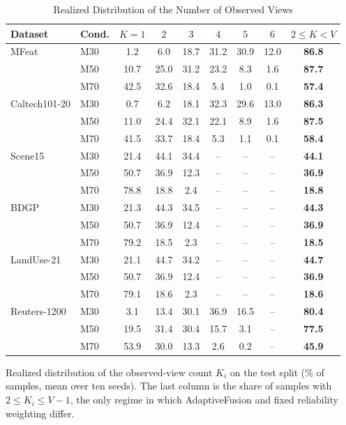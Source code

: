 \begin{table}[!t]
\caption{Realized Distribution of the Number of Observed Views}
\label{tab:kdist}
\centering
\footnotesize
\setlength{\tabcolsep}{3pt}
\begin{tabular}{llccccccc}
\toprule
Dataset & Cond. & $K{=}1$ & $2$ & $3$ & $4$ & $5$ & $6$ & $2{\le}K{<}V$ \\
\midrule
MFeat & M30 & 1.2 & 6.0 & 18.7 & 31.2 & 30.9 & 12.0 & \textbf{86.8} \\
 & M50 & 10.7 & 25.0 & 31.2 & 23.2 & 8.3 & 1.6 & \textbf{87.7} \\
 & M70 & 42.5 & 32.6 & 18.4 & 5.4 & 1.0 & 0.1 & \textbf{57.4} \\
\addlinespace[2pt]
Caltech101-20 & M30 & 0.7 & 6.2 & 18.1 & 32.3 & 29.6 & 13.0 & \textbf{86.3} \\
 & M50 & 11.0 & 24.4 & 32.1 & 22.1 & 8.9 & 1.6 & \textbf{87.5} \\
 & M70 & 41.5 & 33.7 & 18.4 & 5.3 & 1.1 & 0.1 & \textbf{58.4} \\
\addlinespace[2pt]
Scene15 & M30 & 21.4 & 44.1 & 34.4 & -- & -- & -- & \textbf{44.1} \\
 & M50 & 50.7 & 36.9 & 12.3 & -- & -- & -- & \textbf{36.9} \\
 & M70 & 78.8 & 18.8 & 2.4 & -- & -- & -- & \textbf{18.8} \\
\addlinespace[2pt]
BDGP & M30 & 21.3 & 44.3 & 34.5 & -- & -- & -- & \textbf{44.3} \\
 & M50 & 50.7 & 36.9 & 12.4 & -- & -- & -- & \textbf{36.9} \\
 & M70 & 79.2 & 18.5 & 2.3 & -- & -- & -- & \textbf{18.5} \\
\addlinespace[2pt]
LandUse-21 & M30 & 21.1 & 44.7 & 34.2 & -- & -- & -- & \textbf{44.7} \\
 & M50 & 50.7 & 36.9 & 12.4 & -- & -- & -- & \textbf{36.9} \\
 & M70 & 79.1 & 18.6 & 2.3 & -- & -- & -- & \textbf{18.6} \\
\addlinespace[2pt]
Reuters-1200 & M30 & 3.1 & 13.4 & 30.1 & 36.9 & 16.5 & -- & \textbf{80.4} \\
 & M50 & 19.5 & 31.4 & 30.4 & 15.7 & 3.1 & -- & \textbf{77.5} \\
 & M70 & 53.9 & 30.0 & 13.3 & 2.6 & 0.2 & -- & \textbf{45.9} \\
\bottomrule
\end{tabular}
\par\smallskip
\parbox{\linewidth}{\scriptsize Realized distribution of the observed-view count $K_i$ on the test split (\% of samples, mean over ten seeds). The last column is the share of samples with $2\le K_i\le V-1$, the only regime in which AdaptiveFusion and fixed reliability weighting differ.}
\end{table}
